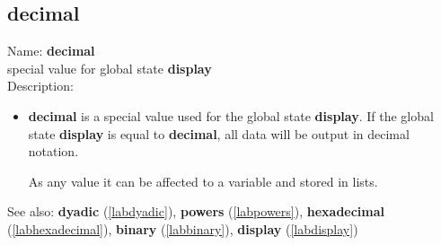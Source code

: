 \subsection{decimal}
\label{labdecimal}
\noindent Name: \textbf{decimal}\\
special value for global state \textbf{display}\\
\noindent Description: \begin{itemize}

\item \textbf{decimal} is a special value used for the global state \textbf{display}.
   If the global state \textbf{display} is equal to \textbf{decimal}, all data will
   be output in decimal notation.
    
   As any value it can be affected to a variable and stored in lists.
\end{itemize}
See also: \textbf{dyadic} (\ref{labdyadic}), \textbf{powers} (\ref{labpowers}), \textbf{hexadecimal} (\ref{labhexadecimal}), \textbf{binary} (\ref{labbinary}), \textbf{display} (\ref{labdisplay})
